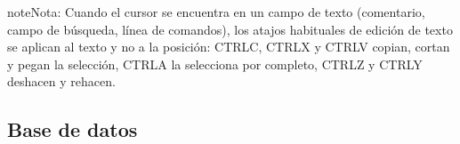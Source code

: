 \documentclass[letterpaper,10pt,spanish]{sphinxmanual}
\begin{document}
\begin{sphinxadmonition}{note}{Nota:}
\sphinxAtStartPar
Cuando el cursor se encuentra en un campo de texto (comentario, campo de búsqueda, línea de comandos), los atajos habituales de edición de texto se aplican al texto y no a la posición: CTRL\sphinxhyphen{}C, CTRL\sphinxhyphen{}X y CTRL\sphinxhyphen{}V copian, cortan y pegan la selección, CTRL\sphinxhyphen{}A la selecciona por completo, CTRL\sphinxhyphen{}Z y CTRL\sphinxhyphen{}Y deshacen y rehacen.
\end{sphinxadmonition}


\subsection{Base de datos}
\label{\detokenize{raccourcis:base-de-donnees}}\label{\detokenize{raccourcis:raccourcis-generaux}}
\end{document}

